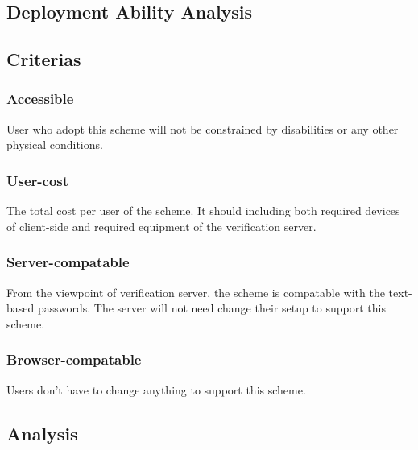 \begin{CJK}{Bg5}{bsmi}
\section{Deployment Ability Analysis}

\subsection{Criterias}

\subsubsection{Accessible}

User who adopt this scheme will not be constrained by disabilities or any other physical conditions.

\subsubsection{User-cost}

The total cost per user of the scheme. It should including both required devices of client-side and required equipment of the verification server.

\subsubsection{Server-compatable}

From the viewpoint of verification server, the scheme is compatable with the text-based passwords. The server will not need change their setup to support this scheme. 

\subsubsection{Browser-compatable}

Users don't have to change anything to support this scheme. 

\subsection{Analysis}

\end{CJK}